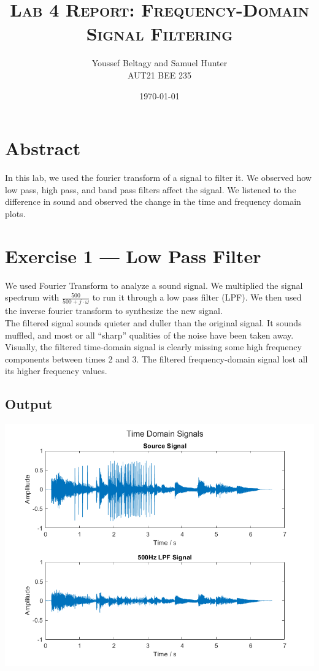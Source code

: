 \documentclass[11pt]{article}
\title{
    \textsc{Lab 4 Report: Frequency-Domain Signal Filtering}
}
\author{
    \Large{Youssef Beltagy and Samuel Hunter} \\
    \large \textsc{AUT21 BEE 235}
}
\date{\today}
\begin{document}
\maketitle %
\pagebreak


\section{Abstract}

In this lab, we used the fourier transform of a signal
to filter it. We observed how low pass, high pass, and band pass filters affect the signal.
We listened to the difference in sound and observed the change in the time and frequency domain plots.

\section{Exercise 1 --- Low Pass Filter}

We used Fourier Transform to analyze a sound signal.
We multiplied the signal spectrum with $\frac{500}{500 + j \cdot \omega}$
to run it through a low pass filter (LPF). We then used the inverse fourier transform to
synthesize the new signal.\\

The filtered signal sounds quieter and duller than the original signal.
It sounds muffled, and most or all ``sharp'' qualities of the noise have been taken away.\\

Visually, the filtered time-domain signal is clearly missing some high frequency
components between times 2 and 3. The filtered frequency-domain signal
lost all its higher frequency values.

\subsection{Output}

\includegraphics[height=0.5\textheight]{lpf_time.png}
\end{document}
